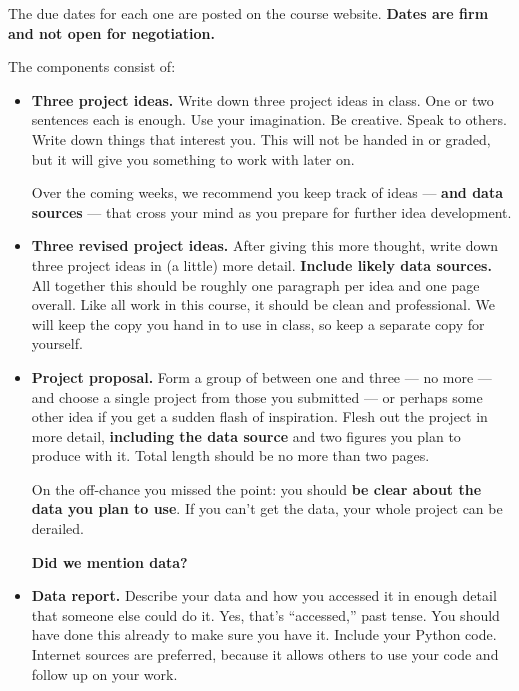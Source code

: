 \documentclass[11pt]{article}
\begin{document}
The due dates for each one are posted on the course website.
{\bf Dates are firm and not open for negotiation.}


The components consist of:
\begin{itemize}

\item {\bf Three project ideas.}
Write down three project ideas in class.
One or two sentences each is enough.
Use your imagination.  Be creative.  Speak to others.
Write down things that interest you.
This will not be handed in or graded, but it will give you something to work with later on.

Over the coming weeks, we recommend you keep track of ideas --- {\bf and data sources\/}
--- that cross
your mind as you prepare for further idea development.


\item {\bf Three revised project ideas.}
After giving this more thought, write down three project ideas in (a little) more detail.
{\bf Include likely data sources.}
All together this should be roughly one paragraph per idea and one page overall.
Like all work in this course, it should be clean and professional.
We will keep the copy you hand in to use in class, so keep a separate copy for yourself.

\item{\bf Project proposal.}
Form a group of between one and three --- no more ---
and choose a single project from those you submitted ---
or perhaps some other idea if you get a sudden flash of inspiration.
Flesh out the project in more detail, {\bf including the data source\/} and
two figures you plan to produce with it.
Total length should be no more than two pages.

On the off-chance you missed the point:  you should {\bf be clear about the data you plan to use\/}.
If you can't get the data, your whole project can be derailed.

{\bf Did we mention data?}

\item {\bf Data report.}
Describe your data and how you accessed it in enough detail that someone else could do it.
Yes, that's ``accessed,'' past tense.  You should have done this already to make sure you have it.
Include your Python code.  %
Internet sources are preferred, because it allows others to use your code and
follow up on your work.


\end{itemize}
\end{document}
